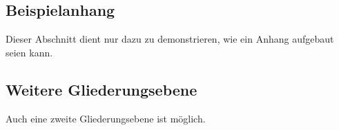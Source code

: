 \documentclass[12pt,oneside,titlepage,listof=totoc,bibliography=totoc]{scrartcl}
\begin{document}
\begin{appendices}
\makeatletter
\renewcommand\@seccntformat[1]{\csname the#1\endcsname:\quad}
\makeatother
{} %
	\renewcommand{\thesection}{\AppendixName\ \arabic{section}}
	\renewcommand\thesubsection{\AppendixName\ \arabic{section}.\arabic{subsection}}

	\section{Beispielanhang}\label{Beispielanhang}
	Dieser Abschnitt dient nur dazu zu demonstrieren, wie ein Anhang aufgebaut seien kann.
	\subsection{Weitere Gliederungsebene}
	Auch eine zweite Gliederungsebene ist möglich.

\end{appendices}


\newpage







\end{document}
